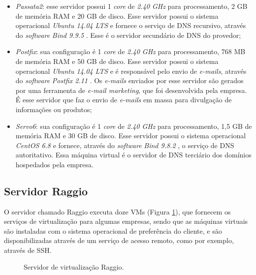 \begin{itemize}
 \item \textit{Passata2}: esse servidor possui 1 \textit{core} de \textit{2.40 GHz} para processamento, 2 GB de memória RAM e 20 GB de disco. 
 Esse servidor possui o sistema operacional \textit{Ubuntu 14.04 \ac{LTS}} \cite{ubuntu} e fornece o serviço de \ac{DNS} recursivo, através do 
 \textit{software} \textit{Bind 9.9.5} \cite{bind}. Esse é o servidor secundário de \ac{DNS} do provedor;
 
 \item \textit{Postfix}: sua configuração é 1 \textit{core} de \textit{2.40 GHz} para processamento, 768 MB de memória RAM e 50 GB de disco. 
 Esse servidor possui o sistema operacional \textit{Ubuntu 14.04 \ac{LTS}} \cite{ubuntu} e é responsável pelo envio de \textit{e-mails}, 
 através do \textit{software} \textit{Postfix 2.11} \cite{postfix}. Os \textit{e-mails} enviados por esse servidor são gerados por uma 
 ferramenta de \textit{e-mail marketing}, que foi desenvolvida pela empresa. É esse servidor que faz o envio de \textit{e-mails} em massa para 
 divulgação de informações ou produtos;
 
 \item \textit{Servo6}: sua configuração é 1 \textit{core} de \textit{2.40 GHz} para processamento, 1,5 GB de memória RAM e 30 GB de disco. 
 Esse servidor possui o sistema operacional \textit{CentOS 6.8} e fornece, através do \textit{software} \textit{Bind 9.8.2} \cite{bind}, o 
 serviço de \ac{DNS} autoritativo. Essa máquina virtual é o servidor de \ac{DNS} terciário dos domínios hospedados pela empresa.
\end{itemize}

\subsection{Servidor Raggio}
\label{section:serv_raggio}

O servidor chamado Raggio executa doze \ac{VM}s (Figura \ref{fig:servidor_raggio}), que fornecem os serviços de virtualização para algumas empresas,
sendo que as máquinas virtuais são instaladas com o sistema operacional de preferência do cliente, e são disponibilizadas através de um serviço 
de acesso remoto, como por exemplo, através de \ac{SSH}.

\begin{figure}[h!]
 \centering
 \caption{Servidor de virtualização Raggio.}
 \label{fig:servidor_raggio}
\end{figure}

